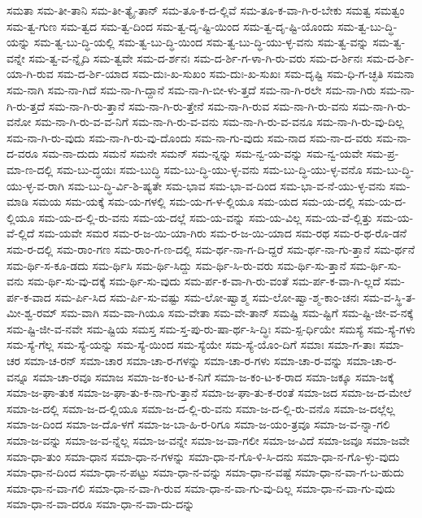 {ಸಮತಾ
ಸಮ-ತೀ-ತಾನಿ
ಸಮ-ತೀ-ತ್ಯೈ-ತಾನ್
ಸಮ-ತೂ-ಕ-ದ-ಲ್ಲಿವೆ
ಸಮ-ತೂ-ಕ-ವಾ-ಗಿ-ರ-ಬೇಕು
ಸಮತ್ವ
ಸಮತ್ವಂ
ಸಮ-ತ್ವ-ಗುಣ
ಸಮ-ತ್ವದ
ಸಮ-ತ್ವ-ದಿಂದ
ಸಮ-ತ್ವ-ದೃ-ಷ್ಟಿ-ಯಿಂದ
ಸಮ-ತ್ವ-ದೃ-ಷ್ಟಿ-ಯೊಂದು
ಸಮ-ತ್ವ-ಬು-ದ್ಧಿ-ಯನ್ನು
ಸಮ-ತ್ವ-ಬು-ದ್ಧಿ-ಯಲ್ಲಿ
ಸಮ-ತ್ವ-ಬು-ದ್ಧಿ-ಯಿಂದ
ಸಮ-ತ್ವ-ಬು-ದ್ಧಿ-ಯು-ಳ್ಳ-ವನು
ಸಮ-ತ್ವ-ವನ್ನು
ಸಮ-ತ್ವ-ವನ್ನೇ
ಸಮ-ತ್ವ-ವ-ನ್ನೈದಿ
ಸಮ-ತ್ವವೇ
ಸಮ-ದ-ರ್ಶನಃ
ಸಮ-ದ-ರ್ಶಿ-ಗ-ಳಾ-ಗಿ-ರು-ವರು
ಸಮ-ದ-ರ್ಶಿನಃ
ಸಮ-ದ-ರ್ಶಿ-ಯಾ-ಗಿ-ರುವ
ಸಮ-ದ-ರ್ಶಿ-ಯಾದ
ಸಮ-ದುಃ-ಖ-ಸುಖಂ
ಸಮ-ದುಃ-ಖ-ಸುಖಃ
ಸಮ-ದೃಷ್ಟಿ
ಸಮ-ಧಿ-ಗ-ಚ್ಛತಿ
ಸಮನಾ
ಸಮ-ನಾಗಿ
ಸಮ-ನಾ-ಗಿದೆ
ಸಮ-ನಾ-ಗಿ-ದ್ದಾನೆ
ಸಮ-ನಾ-ಗಿ-ಬೀ-ಳು-ತ್ತದೆ
ಸಮ-ನಾ-ಗಿ-ರಲೇ
ಸಮ-ನಾ-ಗಿರು
ಸಮ-ನಾ-ಗಿ-ರು-ತ್ತದೆ
ಸಮ-ನಾ-ಗಿ-ರು-ತ್ತಾನೆ
ಸಮ-ನಾ-ಗಿ-ರು-ತ್ತೇನೆ
ಸಮ-ನಾ-ಗಿ-ರುವ
ಸಮ-ನಾ-ಗಿ-ರು-ವನು
ಸಮ-ನಾ-ಗಿ-ರು-ವನೋ
ಸಮ-ನಾ-ಗಿ-ರು-ವ-ವ-ನಿಗೆ
ಸಮ-ನಾ-ಗಿ-ರು-ವ-ವನು
ಸಮ-ನಾ-ಗಿ-ರು-ವ-ವನೂ
ಸಮ-ನಾ-ಗಿ-ರು-ವು-ದಿಲ್ಲ
ಸಮ-ನಾ-ಗಿ-ರು-ವುದು
ಸಮ-ನಾ-ಗಿ-ರು-ವು-ದೊಂದು
ಸಮ-ನಾ-ಗು-ವುದು
ಸಮ-ನಾದ
ಸಮ-ನಾ-ದ-ವರು
ಸಮ-ನಾ-ದ-ವರೂ
ಸಮ-ನಾ-ದುದು
ಸಮನೆ
ಸಮನೇ
ಸಮನ್
ಸಮ-ನ್ನನ್ನು
ಸಮ-ನ್ವ-ಯ-ವನ್ನು
ಸಮ-ನ್ವ-ಯವೇ
ಸಮ-ಪ್ರ-ಮಾ-ಣ-ದಲ್ಲಿ
ಸಮ-ಬು-ದ್ಧಯಃ
ಸಮ-ಬುದ್ಧಿ
ಸಮ-ಬು-ದ್ಧಿ-ಯು-ಳ್ಳ-ವನು
ಸಮ-ಬು-ದ್ಧಿ-ಯು-ಳ್ಳ-ವನೊ
ಸಮ-ಬು-ದ್ಧಿ-ಯು-ಳ್ಳ-ವ-ರಾಗಿ
ಸಮ-ಬು-ದ್ಧಿ-ರ್ವಿ-ಶಿ-ಷ್ಯತೇ
ಸಮ-ಭಾವ
ಸಮ-ಭಾ-ವ-ದಿಂದ
ಸಮ-ಭಾ-ವ-ನೆ-ಯು-ಳ್ಳ-ವನು
ಸಮ-ಮಾಡಿ
ಸಮಯ
ಸಮ-ಯಕ್ಕೆ
ಸಮ-ಯ-ಗಳಲ್ಲಿ
ಸಮ-ಯ-ಗ-ಳ-ಲ್ಲಿಯೂ
ಸಮ-ಯದ
ಸಮ-ಯ-ದಲ್ಲಿ
ಸಮ-ಯ-ದ-ಲ್ಲಿಯೂ
ಸಮ-ಯ-ದ-ಲ್ಲಿ-ರು-ವನು
ಸಮ-ಯ-ದಲ್ಲೆ
ಸಮ-ಯ-ವನ್ನು
ಸಮ-ಯ-ವಿಲ್ಲ
ಸಮ-ಯ-ವೆ-ಲ್ಲಿತ್ತು
ಸಮ-ಯ-ವೆ-ಲ್ಲಿದೆ
ಸಮ-ಯವೇ
ಸಮರ
ಸಮ-ರ-ಜ-ಯಿ-ಯಾ-ಗಿರು
ಸಮ-ರ-ಜ-ಯಿ-ಯಾದ
ಸಮ-ರಥ
ಸಮ-ರ-ಥ-ರೊ-ಡನೆ
ಸಮ-ರ-ದಲ್ಲಿ
ಸಮ-ರಾಂ-ಗಣ
ಸಮ-ರಾಂ-ಗ-ಣ-ದಲ್ಲಿ
ಸಮ-ರ್ಥ-ನಾ-ಗ-ದಿ-ದ್ದರೆ
ಸಮ-ರ್ಥ-ನಾ-ಗು-ತ್ತಾನೆ
ಸಮ-ರ್ಥನೆ
ಸಮ-ರ್ಥಿ-ಸ-ಕೂ-ಡದು
ಸಮ-ರ್ಥಿಸಿ
ಸಮ-ರ್ಥಿ-ಸಿದ್ದು
ಸಮ-ರ್ಥಿ-ಸಿ-ರು-ವರು
ಸಮ-ರ್ಥಿ-ಸು-ತ್ತಾನೆ
ಸಮ-ರ್ಥಿ-ಸು-ವನು
ಸಮ-ರ್ಥಿ-ಸು-ವು-ದಕ್ಕೆ
ಸಮ-ರ್ಥಿ-ಸು-ವುದು
ಸಮ-ರ್ಪ-ಕ-ವಾ-ಗಿ-ರು-ವಂತೆ
ಸಮ-ರ್ಪ-ಕ-ವಾ-ಗಿ-ಲ್ಲದೆ
ಸಮ-ರ್ಪ-ಕ-ವಾದ
ಸಮ-ರ್ಪಿ-ಸಿದ
ಸಮ-ರ್ಪಿ-ಸು-ವಷ್ಟು
ಸಮ-ಲೋ-ಷ್ವಾಶ್ಮ
ಸಮ-ಲೋ-ಷ್ವಾ-ಶ್ಮ-ಕಾಂ-ಚನಃ
ಸಮ-ವ-ಸ್ಥಿ-ತ-ಮೀ-ಶ್ವ-ರಮ್
ಸಮ-ವಾಗಿ
ಸಮ-ವಾ-ಗಿಯೂ
ಸಮ-ವೇತಾ
ಸಮ-ವೇ-ತಾನ್
ಸಮಷ್ಟಿ
ಸಮ-ಷ್ಟಿಗೆ
ಸಮ-ಷ್ಟಿ-ಜೀ-ವ-ನಕ್ಕೆ
ಸಮ-ಷ್ಟಿ-ಜೀ-ವ-ನವೇ
ಸಮ-ಷ್ಟಿಯ
ಸಮಸ್ತ
ಸಮ-ಸ್ತ-ಪು-ರು-ಷಾ-ರ್ಥ-ಸಿ-ದ್ಧಿಃ
ಸಮ-ಸ್ಪ-ರ್ಧಿಯೇ
ಸಮಸ್ಯೆ
ಸಮ-ಸ್ಯೆ-ಗಳು
ಸಮ-ಸ್ಯೆ-ಗೆಲ್ಲ
ಸಮ-ಸ್ಯೆ-ಯನ್ನು
ಸಮ-ಸ್ಯೆ-ಯಿಂದ
ಸಮ-ಸ್ಯೆಯೇ
ಸಮ-ಸ್ಯೆ-ಯೊಂ-ದಿಗೆ
ಸಮಾಃ
ಸಮಾ-ಗ-ತಾಃ
ಸಮಾ-ಚರ
ಸಮಾ-ಚ-ರನ್
ಸಮಾ-ಚಾರ
ಸಮಾ-ಚಾ-ರ-ಗಳನ್ನು
ಸಮಾ-ಚಾ-ರ-ಗಳು
ಸಮಾ-ಚಾ-ರ-ವನ್ನು
ಸಮಾ-ಚಾ-ರ-ವನ್ನೂ
ಸಮಾ-ಚಾ-ರವೂ
ಸಮಾಜ
ಸಮಾ-ಜ-ಕಂ-ಟ-ಕ-ನಿಗೆ
ಸಮಾ-ಜ-ಕಂ-ಟ-ಕ-ರಾದ
ಸಮಾ-ಜಕ್ಕೂ
ಸಮಾ-ಜಕ್ಕೆ
ಸಮಾ-ಜ-ಘಾ-ತುಕ
ಸಮಾ-ಜ-ಘಾ-ತು-ಕ-ನಾ-ಗು-ತ್ತಾನೆ
ಸಮಾ-ಜ-ಘಾ-ತು-ಕ-ರಂತೆ
ಸಮಾ-ಜದ
ಸಮಾ-ಜ-ದ-ಮೇಲೆ
ಸಮಾ-ಜ-ದಲ್ಲಿ
ಸಮಾ-ಜ-ದ-ಲ್ಲಿಯೂ
ಸಮಾ-ಜ-ದ-ಲ್ಲಿ-ರು-ವನು
ಸಮಾ-ಜ-ದ-ಲ್ಲಿ-ರು-ವನೊ
ಸಮಾ-ಜ-ದಲ್ಲೆಲ್ಲ
ಸಮಾ-ಜ-ದಿಂದ
ಸಮಾ-ಜ-ದೊ-ಳಗೆ
ಸಮಾ-ಜ-ಬಾ-ಹಿ-ರ-ರಿಗೂ
ಸಮಾ-ಜ-ಯಂ-ತ್ರವೂ
ಸಮಾ-ಜ-ವ-ನ್ನಾ-ಗಲಿ
ಸಮಾ-ಜ-ವನ್ನು
ಸಮಾ-ಜ-ವ-ನ್ನೆಲ್ಲ
ಸಮಾ-ಜ-ವನ್ನೇ
ಸಮಾ-ಜ-ವಾ-ಗಲೀ
ಸಮಾ-ಜ-ವಿದೆ
ಸಮಾ-ಜವೂ
ಸಮಾ-ಜವೇ
ಸಮಾ-ಧಾ-ತುಂ
ಸಮಾ-ಧಾನ
ಸಮಾ-ಧಾ-ನ-ಗಳನ್ನು
ಸಮಾ-ಧಾ-ನ-ಗೊ-ಳಿ-ಸಿ-ದನು
ಸಮಾ-ಧಾ-ನ-ಗೊ-ಳ್ಳು-ವುದು
ಸಮಾ-ಧಾ-ನ-ದಿಂದ
ಸಮಾ-ಧಾ-ನ-ಪಟ್ಟು
ಸಮಾ-ಧಾ-ನ-ವನ್ನು
ಸಮಾ-ಧಾ-ನ-ವಷ್ಟೆ
ಸಮಾ-ಧಾ-ನ-ವಾ-ಗ-ಬ-ಹುದು
ಸಮಾ-ಧಾ-ನ-ವಾ-ಗಲಿ
ಸಮಾ-ಧಾ-ನ-ವಾ-ಗಿ-ರುವ
ಸಮಾ-ಧಾ-ನ-ವಾ-ಗು-ವು-ದಿಲ್ಲ
ಸಮಾ-ಧಾ-ನ-ವಾ-ಗು-ವುದು
ಸಮಾ-ಧಾ-ನ-ವಾ-ದರೂ
ಸಮಾ-ಧಾ-ನ-ವಾ-ದು-ದನ್ನು
}
